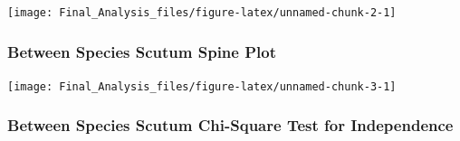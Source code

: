 \begin{Shaded}
\begin{Highlighting}[]
\NormalTok{, }\NormalTok{, }\NormalTok{, }\NormalTok{, }\NormalTok{)}
\end{Highlighting}
\end{Shaded}

\begin{center}\texttt{[image: Final\_Analysis\_files/figure-latex/unnamed-chunk-2-1]} \end{center}

\subsubsection{Between Species Scutum Spine
Plot}\label{between-species-scutum-spine-plot}

\begin{Shaded}
\begin{Highlighting}[]
\NormalTok{, }\NormalTok{, }\NormalTok{, } \NormalTok{(}\NormalTok{))}
\end{Highlighting}
\end{Shaded}

\begin{center}\texttt{[image: Final\_Analysis\_files/figure-latex/unnamed-chunk-3-1]} \end{center}

\subsubsection{Between Species Scutum Chi-Square Test for
Independence}\label{between-species-scutum-chi-square-test-for-independence}

\begin{Shaded}
\begin{Highlighting}[]
\NormalTok{(} \NormalTok{, } \NormalTok{)}
\end{Highlighting}
\end{Shaded}

